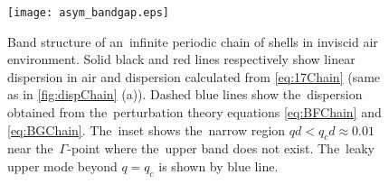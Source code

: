 \begin{figure}
\begin{center}
\texttt{[image: asym\_bandgap.eps]}
\caption{Band structure of an~infinite periodic chain of shells in inviscid air environment. Solid black and red lines respectively show linear dispersion in air and dispersion calculated from \cref{eq:17Chain} (same as in \cref{fig:dispChain} (a)). Dashed blue lines show the~dispersion obtained from the~perturbation theory equations \cref{eq:BFChain} and \cref{eq:BGChain}. The~inset shows the~narrow region  $qd<q_cd \approx 0.01$ near the~$\Gamma$-point where the~upper band does not exist. The~leaky upper mode beyond $q=q_c$ is shown by blue line.}
\label{fig:asymgapChain}
\end{center}
\end{figure}


